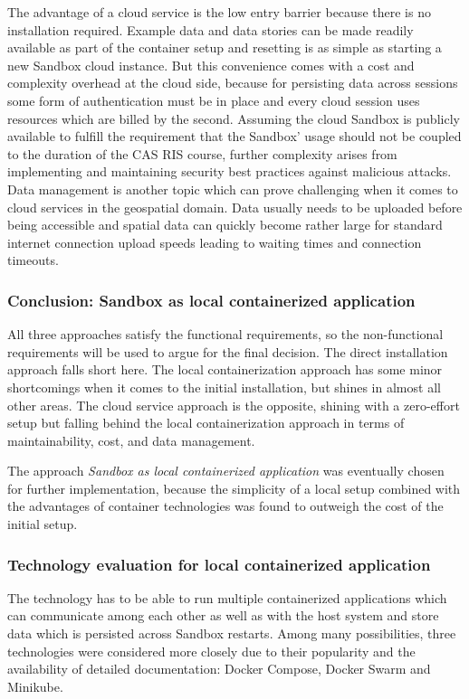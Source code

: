 \documentclass[11pt, a4paper, oneside, parskip=full-]{scrartcl}
\begin{document}
The advantage of a cloud service is the low entry barrier because there is no
installation required. Example data and data stories can be made readily
available as part of the container setup and resetting is as simple as starting
a new Sandbox cloud instance. But this convenience comes with a cost and
complexity overhead at the cloud side, because for persisting data across
sessions some form of authentication must be in place and every cloud session
uses resources which are billed by the second. Assuming the cloud Sandbox is
publicly available to fulfill the requirement that the Sandbox' usage should not
be coupled to the duration of the CAS RIS course, further complexity arises from
implementing and maintaining security best practices against malicious attacks.
Data management is another topic which can prove challenging when it comes to
cloud services in the geospatial domain. Data usually needs to be uploaded
before being accessible and spatial data can quickly become rather large for
standard internet connection upload speeds leading to waiting times and
connection timeouts.

\subsubsection*{Conclusion: Sandbox as local containerized application}
All three approaches satisfy the functional requirements, so the non-functional
requirements will be used to argue for the final decision. The direct
installation approach falls short here. The local containerization approach has
some minor shortcomings when it comes to the initial installation, but shines in
almost all other areas. The cloud service approach is the opposite, shining with
a zero-effort setup but falling behind the local containerization approach in
terms of maintainability, cost, and data management.

The approach \emph{Sandbox as local containerized application} was eventually
chosen for further implementation, because the simplicity of a local setup
combined with the advantages of container technologies was found to outweigh the
cost of the initial setup.

\subsubsection{Technology evaluation for local containerized application}
The technology has to be able to run multiple containerized applications which
can communicate among each other as well as with the host system and store data
which is persisted across Sandbox restarts. Among many possibilities, three
technologies were considered more closely due to their popularity and the
availability of detailed documentation: Docker Compose, Docker Swarm and
Minikube.
\end{document}
